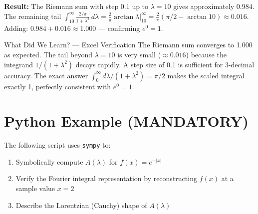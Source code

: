 \documentclass[12pt,a4paper]{article}
\begin{document}
\textbf{Result:} The Riemann sum with step 0.1 up to $\lambda=10$ gives approximately $0.984$. The remaining tail $\int_{10}^{\infty}\frac{2/\pi}{1+\lambda^2}\,d\lambda = \frac{2}{\pi}\arctan\lambda\Big|_{10}^{\infty} = \frac{2}{\pi}(\pi/2-\arctan 10)\approx 0.016$. Adding: $0.984+0.016\approx1.000$ --- confirming $e^0=1$. \checkmark

\begin{learnbox}{What Did We Learn? --- Excel Verification}
The Riemann sum converges to 1.000 as expected. The tail beyond $\lambda=10$ is very small ($\approx0.016$) because the integrand $1/(1+\lambda^2)$ decays rapidly. A step size of 0.1 is sufficient for 3-decimal accuracy. The exact answer $\int_0^\infty d\lambda/(1+\lambda^2)=\pi/2$ makes the scaled integral exactly 1, perfectly consistent with $e^0=1$.
\end{learnbox}

\section{Python Example (MANDATORY)}

The following script uses \texttt{sympy} to:
\begin{enumerate}
  \item Symbolically compute $A(\lambda)$ for $f(x)=e^{-|x|}$
  \item Verify the Fourier integral representation by reconstructing $f(x)$ at a sample value $x=2$
  \item Describe the Lorentzian (Cauchy) shape of $A(\lambda)$
\end{enumerate}
\end{document}
